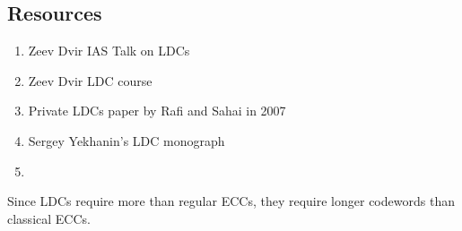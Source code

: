 \documentclass{article}
\theoremstyle{definition}
\begin{document}
\subsection{Resources}

\begin{enumerate}
    \item Zeev Dvir IAS Talk on LDCs
    \item Zeev Dvir LDC course
    \item Private LDCs paper by Rafi and Sahai in 2007
    \item Sergey Yekhanin's LDC monograph
    \item 
\end{enumerate}

Since LDCs require more than regular ECCs, they require longer codewords than classical
ECCs.



\newpage
\end{document}
